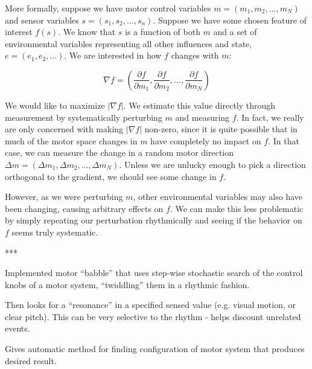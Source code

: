 More formally, suppose we have motor control variables
$m=(m_1,m_2,...,m_N)$ and sensor variables $s=(s_1,s_2,...,s_n)$.
Suppose we have some chosen feature of interest $f(s)$.  We know that
$s$ is a function of both $m$ and a set of environmental variables
representing all other influences and state, $e=(e_1,e_2,...)$.
We are interested in how $f$ changes with $m$:

\begin{equation}
\nabla f  = \left(\frac{\partial f}{\partial m_1 }, \frac{\partial f}{\partial m_2 }, \dots,  \frac{\partial f}{\partial m_N }  \right)
\end{equation}

We would like to maximize $|\nabla{}f|$.  We estimate this value
directly through measurement by systematically perturbing $m$ and
measuring $f$.
%
In fact, we really are only concerned with making $|\nabla{}f|$ 
non-zero, since it is quite possible that in much of the motor space 
changes in $m$ have completely no impact on $f$.
%
In that case, we can measure the change in a random motor 
direction $\Delta{}m=(\Delta{}m_1,\Delta{}m_2,...,\Delta{}m_N)$.
%
Unless we are unlucky enough to pick a direction orthogonal to 
the gradient, we should see some change in $f$.

However, as we were perturbing $m$, other environmental variables
may also have been changing, causing arbitrary effects on $f$.
We can make this less problematic by simply repeating our perturbation
rhythmically and seeing if the behavior on $f$ seems truly
systematic.


***

Implemented motor ``babble'' that uses step-wise stochastic search of
the control knobs of a motor system, ``twiddling'' them in a rhythmic
fashion.

Then looks for a ``resonance'' in a specified sensed value
(e.g. visual motion, or clear pitch).  This can be very selective to
the rhythm - helps discount unrelated events.

Gives automatic method for finding configuration of motor system that
produces desired result.


